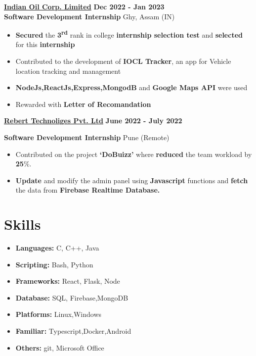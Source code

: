 \documentclass[]{article}
\newenvironment{tightemize}{
\vspace{-\topsep}
\begin{itemize}\itemsep0pt \parskip2pt \parsep2pt}
{\end{itemize}}
\newcommand{\company}[2]{
  {\Large{{#1}}
  \hfill \footnotesize{#2}}
}
\newcommand{\role}[2]{
  {\large {{#1}}
    \hfill \small{#2}
  }
}
\begin{document}
\begin{multicols}{2}
\begin{flushleft}
    \company{\textbf{\href{https://iocl.com/}{Indian Oil Corp. Limited}}}{\textbf{Dec 2022 - Jan 2023}} \\
    \role{\textbf{Software Development Internship}}{Ghy, Assam (IN)}
    \begin{tightemize}
      \item {\textbf{Secured} the  \textbf{3\textsuperscript{rd}} rank in  college \textbf{internship selection test} and  \textbf{selected} for this \textbf{internship}}
      \item {Contributed to the development of  \textbf{IOCL Tracker}, an app for Vehicle location tracking and management}
      \item {\textbf{NodeJs,ReactJs,Express,MongodB}} and {\textbf{Google Maps API}} were used
      \item {Rewarded with  \textbf{Letter of Recomandation}}
    \end{tightemize}


    \company{\textbf{\href{https://www.linkedin.com/company/rebert-tech/about/}{Rebert Technoliges Pvt. Ltd}}}{\textbf{June 2022 - July 2022}}
    \role{{\textbf{Software Development Internship}}}{Pune (Remote)}
    \begin{tightemize}
      \item Contributed on the project 
            \textbf{‘DoBuizz’} where  \textbf{reduced} the team workload by \textbf{25}\%.
      \item \textbf{Update} and modify the 
      admin panel using \textbf{Javascript}
            functions and \textbf{fetch} the data from \textbf{Firebase Realtime
            Database.}
    \end{tightemize}

 

    \section*{Skills} 
    \begin{tightemize}
      \item \textbf{Languages:} C, C++, Java
      \item \textbf{Scripting:} Bash, Python
      \item \textbf{Frameworks:} React, Flask, Node
      \item \textbf{Database:} SQL, Firebase,MongoDB
      \item \textbf{Platforms:} Linux,Windows
      \item \textbf{Familiar:} Typescript,Docker,Android
      \item \textbf{Others:} git, Microsoft Office
    \end{tightemize}


\end{flushleft}
\end{multicols}
\end{document}
